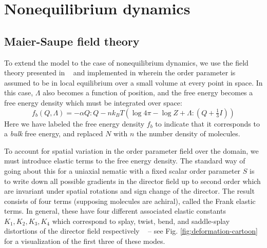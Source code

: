 \documentclass[reqno]{article}
\begin{document}
  \section{Nonequilibrium dynamics} \label{nonequilibrium-dynamics}

  \subsection{Maier-Saupe field theory}
  To extend the model to the case of nonequilibrium dynamics, we use the field
  theory presented in ~\cite{ball_nematic_2010} and implemented in
  \cite{schimming_computational_2020} wherein the order parameter is assumed to
  be in local equilibrium over a small volume at every point in space.
  In this case, $\Lambda$ also becomes a function of position, and the free
  energy becomes a free energy density which must be integrated over space:
  \begin{equation}
    f_b (Q, \Lambda)
    =
    -\alpha Q : Q
    - n k_B T \left(\log 4 \pi - \log Z + \Lambda : \left(Q + \tfrac13 I \right) \right)
  \end{equation}
  Here we have labeled the free energy density $f_b$ to indicate that it corresponds
  to a \textit{bulk} free energy, and replaced $N$ with $n$ the number density of molecules.
  
  To account for spatial variation in the order parameter field over the domain,
  we must introduce elastic terms to the free energy density.
  The standard way of going about this for a uniaxial nematic with a fixed
  scalar order parameter $S$ is to write down all possible gradients in the
  director field up to second order which are invariant under spatial rotations
  and sign change of the director.
  The result consists of four terms (supposing molecules are achiral), called
  the Frank elastic terms.
  In general, these have four different associated elastic constants $K_1, K_2,
  K_3, K_4$ which correspond to splay, twist, bend, and saddle-splay distortions of the
  director field respectively ~\cite{selinger_introduction_2016}
  -- see Fig. \ref{fig:deformation-cartoon} for a visualization of the first
  three of these modes.
  
\end{document}

